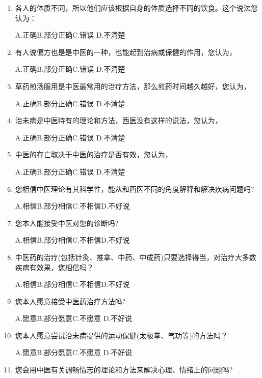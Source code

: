 \begin{enumerate}
A.正确\qquad B.部分正确\qquad C.错误 \qquad D.不清楚

\item 各人的体质不同，所以他们应该根据自身的体质选择不同的饮食。这个说法您认为：

A.正确\qquad B.部分正确\qquad C.错误 \qquad D.不清楚

\item 有人说偏方也是是中医的一种，也能起到治病或保健的作用，您认为，

A.正确\qquad B.部分正确\qquad C.错误 \qquad D.不清楚

\item
草药煎汤服用是中医最常用的治疗方法，那么煎药时间越久越好，您认为，

A.正确\qquad B.部分正确\qquad C.错误 \qquad D.不清楚

\item 
治未病是中医特有的理论和方法，西医没有这样的说法，您认为，

A.正确\qquad B.部分正确\qquad C.错误 \qquad D.不清楚

\item 中医的存亡取决于中医的治疗是否有效，您认为，

A.正确\qquad B.部分正确\qquad C.错误 \qquad D.不清楚

\item 
您相信中医理论有其科学性，能从和西医不同的角度解释和解决疾病问题吗?

A.相信\qquad B.部分相信\qquad C.不相信\qquad D.不好说

\item 您本人能接受中医对您的诊断吗?

A.相信\qquad B.部分相信\qquad C.不相信\qquad D.不好说

\item 中医药的治疗(包括针灸、推拿、中药、中成药)只要选择得当，对治疗大多数疾病有效果，您相信吗？

A.相信\qquad B.部分相信\qquad C.不相信\qquad D.不好说

\item 您本人愿意接受中医药治疗方法吗?

A.愿意\qquad B.部分愿意\qquad C.不愿意 \qquad D.不好说

\item 您本人愿意尝试治未病提供的运动保健(太极拳、气功等)的方法吗？

A.愿意\qquad B.部分愿意\qquad C.不愿意 \qquad D.不好说

\item 您会用中医有关调畅情志的理论和方法来解决心理、情绪上的问题吗?


\end{enumerate}
